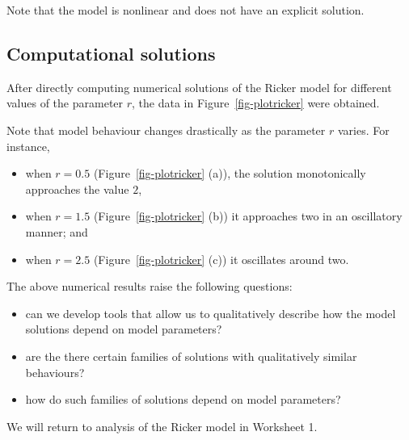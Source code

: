 \documentclass[
  letterpaper,
  DIV=11,
  numbers=noendperiod]{scrreprt}
\providecommand{\tightlist}{%
  \setlength{\itemsep}{0pt}\setlength{\parskip}{0pt}}\usepackage{longtable,booktabs,array}
\begin{document}
Note that the model is nonlinear and does not have an explicit solution.

\hypertarget{computational-solutions}{%
\subsection{Computational solutions}\label{computational-solutions}}

After directly computing numerical solutions of the Ricker model for
different values of the parameter \(r\), the data in
Figure~\ref{fig-plotricker} were obtained.

Note that model behaviour changes drastically as the parameter \(r\)
varies. For instance,

\begin{itemize}
\tightlist
\item
  when \(r=0.5\) (Figure~\ref{fig-plotricker} (a)), the solution
  monotonically approaches the value \(2\),
\item
  when \(r=1.5\) (Figure~\ref{fig-plotricker} (b)) it approaches two in
  an oscillatory manner; and
\item
  when \(r=2.5\) (Figure~\ref{fig-plotricker} (c)) it oscillates around
  two.
\end{itemize}

The above numerical results raise the following questions:

\begin{itemize}
\tightlist
\item
  can we develop tools that allow us to qualitatively describe how the
  model solutions depend on model parameters?
\item
  are the there certain families of solutions with qualitatively similar
  behaviours?
\item
  how do such families of solutions depend on model parameters?
\end{itemize}

We will return to analysis of the Ricker model in Worksheet 1.
\end{document}
